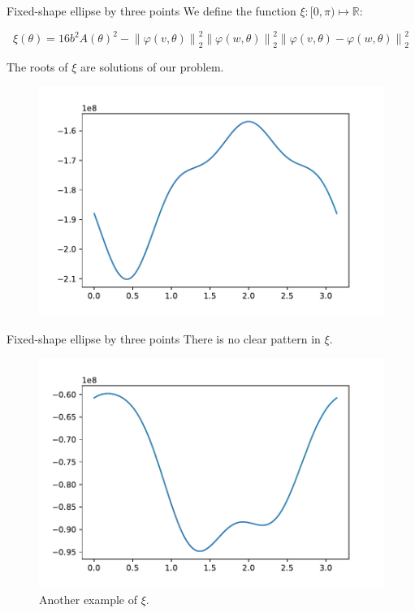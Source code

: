 \documentclass{beamer}
\newcommand{\R}{\mathbb{R}}
\newcommand{\norm}[2][2]{\left\lVert#2\right\rVert_{#1}}
\begin{document}
\begin{frame}{Fixed-shape ellipse by three points}
We define the function $\xi : [0, \pi) \mapsto \R$:

	\begin{equation*}
	\xi(\theta) = 16b^2A(\theta)^2 - \norm{\varphi(v, \theta)}^2\norm{\varphi(w, \theta)}^2\norm{\varphi(v, \theta)-\varphi(w, \theta)}^2
	\end{equation*}
	
The roots of $\xi$ are solutions of our problem.
	\begin{figure}
	\centering

	\includegraphics[scale=.5]{036}
	
\end{figure}
\end{frame}

\begin{frame}{Fixed-shape ellipse by three points}
	There is no clear pattern in $\xi$.
\begin{figure}
	\centering
	
	\includegraphics[scale=.5]{035}
	\caption{Another example of $\xi$.}
\end{figure}
\end{frame}
\end{document}
